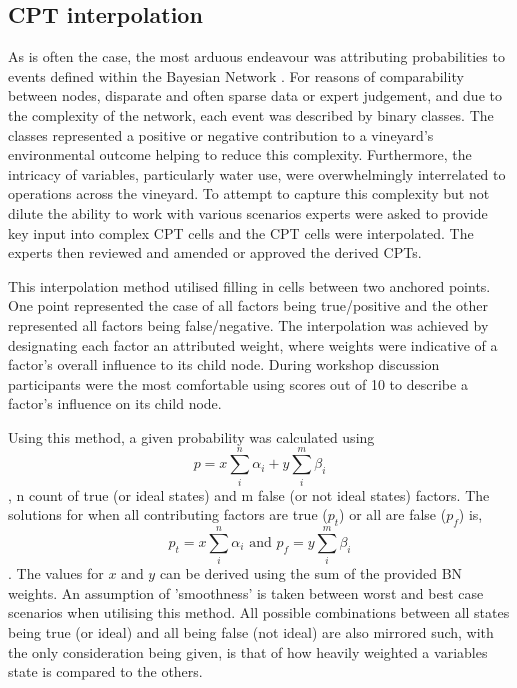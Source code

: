 \subsection{CPT interpolation}

As is often the case, the most arduous endeavour was attributing probabilities to events defined within the Bayesian Network \citep{korbBayesianArtificialIntelligence2011}. For reasons of comparability between nodes, disparate and often sparse data or expert judgement, and due to the complexity of the network, each event was described by binary classes. The classes represented a positive or negative contribution to a vineyard's environmental outcome helping to reduce this complexity. Furthermore, the intricacy of variables, particularly water use, were overwhelmingly interrelated to operations across the vineyard. To attempt to capture this complexity but not dilute the ability to work with various scenarios experts were asked to provide key input into complex CPT cells and the CPT cells were interpolated. The experts then reviewed and amended or approved the derived CPTs.

This interpolation method utilised filling in cells between two anchored points. One point represented the case of all factors being true/positive and the other represented all factors being false/negative. The interpolation was achieved by designating each factor an attributed weight, where weights were indicative of a factor's overall influence to its child node. During workshop discussion participants were the most comfortable using scores out of 10 to describe a factor's influence on its child node.

Using this method, a given probability was calculated using
\begin{equation}
        p=x\sum_{i}^{n}\alpha_{i} + y\sum_{i}^{m}\beta_{i} 
\end{equation},
n count of true (or ideal states) and m false (or not ideal states) factors. The solutions for when all contributing factors are true ($p_t$) or all are false ($p_f$) is,
\begin{equation}
        p_t=x\sum_{i}^{n}\alpha_{i} 
        \text{ and }
        p_f=y\sum_{i}^{m}\beta_{i}
\end{equation}.
The values for $x$ and $y$ can be derived using the sum of the provided BN weights. An assumption of 'smoothness' is taken between worst and best case scenarios when utilising this method. All possible combinations between all states being true (or ideal) and all being false (not ideal) are also mirrored such, with the only consideration being given, is that of how heavily weighted a variables state is compared to the others.


